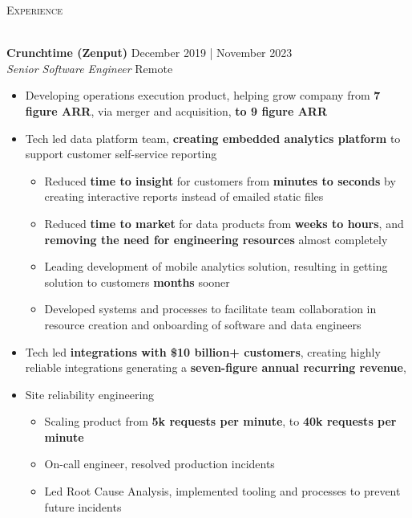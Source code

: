 \documentclass[a4paper]{article}
\newcommand{\lineunder} {
    \vspace*{-8pt} \\
    \hspace*{-18pt} {\color{Mahogany} \hrulefill} \\
}
\newcommand{\header} [1] {
    \vspace{4mm}
    {\hspace*{-18pt}\vspace*{6pt} \large \textsc{\textcolor{Mahogany}{#1}}}
    \vspace*{-6pt} \lineunder
}
\newenvironment{jobdetails}%
    {\list{}{\leftmargin=4mm}\item[]}%
    {\endlist}
\begin{document}
\pagebreak


\header{Experience}
\vspace{1mm}

\textbf{Crunchtime (Zenput)} \hfill December 2019 | November 2023 \\
\textit{Senior Software Engineer} \hfill Remote \\
\vspace{2mm}

\begin{jobdetails}
\begin{itemize} \itemsep 1pt
    \item Developing operations execution product, helping grow company from \textbf{7 figure ARR}, via merger and acquisition, \textbf{to 9 figure ARR}
    \item Tech led data platform team, \textbf{creating embedded analytics platform} to support customer self-service reporting
        \begin{itemize}
            \small
            \item Reduced \textbf{time to insight} for customers from \textbf{minutes to seconds} by creating interactive reports instead of emailed static files
            \item Reduced \textbf{time to market} for data products from \textbf{weeks to hours}, and \textbf{removing the need for engineering resources} almost completely
            \item Leading development of mobile analytics solution, resulting in getting solution to customers \textbf{months} sooner
            \item Developed systems and processes to facilitate team collaboration in resource creation and onboarding of software and data engineers
        \end{itemize}
    \item Tech led \textbf{integrations with \$10 billion+ customers}, creating highly reliable integrations  generating a \textbf{seven-figure annual recurring revenue},
    \item Site reliability engineering
        \begin{itemize}
            \small
            \item Scaling product from \textbf{5k requests per minute}, to \textbf{40k requests per minute}
            \item On-call engineer, resolved production incidents
            \item Led Root Cause Analysis, implemented tooling and processes to prevent future incidents

\end{itemize}
\end{itemize}
\end{jobdetails}
\end{document}
